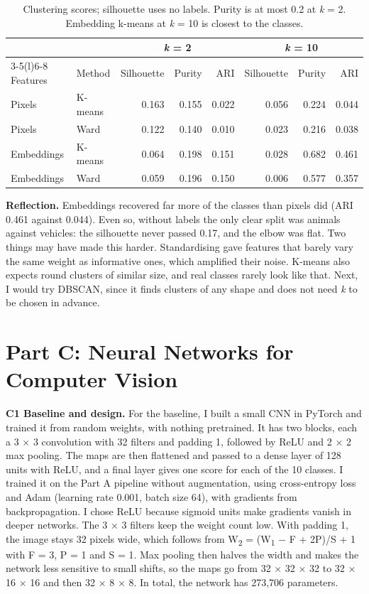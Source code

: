 \documentclass[9pt,a4paper]{extarticle}
\begin{document}
\begin{table}[H]
\centering\footnotesize
\caption{Clustering scores; silhouette uses no labels. Purity is at most 0.2 at \textit{k} = 2. Embedding k-means at \textit{k} = 10 is closest to the classes.}
\label{tab:b1}
\begin{tabular}{@{}llrrrrrr@{}}
\toprule
& & \multicolumn{3}{c}{\textit{k} = 2} & \multicolumn{3}{c}{\textit{k} = 10} \\
\cmidrule(lr){3-5}\cmidrule(l){6-8}
Features & Method & Silhouette & Purity & ARI & Silhouette & Purity & ARI \\
\midrule
Pixels & K-means & 0.163 & 0.155 & 0.022 & 0.056 & 0.224 & 0.044 \\
Pixels & Ward & 0.122 & 0.140 & 0.010 & 0.023 & 0.216 & 0.038 \\
Embeddings & K-means & 0.064 & 0.198 & 0.151 & 0.028 & 0.682 & 0.461 \\
Embeddings & Ward & 0.059 & 0.196 & 0.150 & 0.006 & 0.577 & 0.357 \\
\bottomrule
\end{tabular}
\end{table}

\textbf{Reflection.} Embeddings recovered far more of the classes than pixels did (ARI 0.461 against 0.044). Even so, without labels the only clear split was animals against vehicles: the silhouette never passed 0.17, and the elbow was flat. Two things may have made this harder. Standardising gave features that barely vary the same weight as informative ones, which amplified their noise. K-means also expects round clusters of similar size, and real classes rarely look like that. Next, I would try DBSCAN, since it finds clusters of any shape and does not need \textit{k} to be chosen in advance.


\newpage
\section*{Part C: Neural Networks for Computer Vision}
\setcounter{figure}{0}\setcounter{table}{0}
\renewcommand{\thefigure}{C\arabic{figure}}
\renewcommand{\thetable}{C\arabic{table}}
\textbf{C1 Baseline and design.} For the baseline, I built a small CNN in PyTorch \citep{paszke2019pytorch} and trained it from random weights, with nothing pretrained. It has two blocks, each a 3 × 3 convolution with 32 filters and padding 1, followed by ReLU and 2 × 2 max pooling. The maps are then flattened and passed to a dense layer of 128 units with ReLU, and a final layer gives one score for each of the 10 classes. I trained it on the Part A pipeline without augmentation, using cross-entropy loss and Adam (learning rate 0.001, batch size 64), with gradients from backpropagation. I chose ReLU because sigmoid units make gradients vanish in deeper networks. The 3 × 3 filters keep the weight count low. With padding 1, the image stays 32 pixels wide, which follows from W\textsubscript{2} = (W\textsubscript{1} − F + 2P)/S + 1 with F = 3, P = 1 and S = 1. Max pooling then halves the width and makes the network less sensitive to small shifts, so the maps go from 32 × 32 × 32 to 32 × 16 × 16 and then 32 × 8 × 8. In total, the network has 273,706 parameters.
\end{document}
